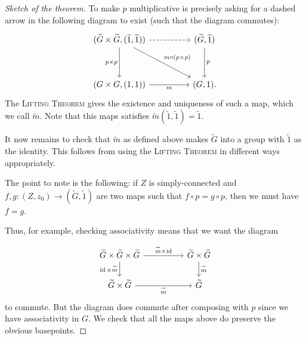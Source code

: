 \documentclass[12pt]{article}
\begin{document}
\begin{proof}[Sketch of the theorem]
	To make $p$ multiplicative is precisely asking for a dashed arrow in the following diagram to exist (such that the diagram commutes):
	\begin{equation*} 
		\begin{tikzcd}
		{(\widetilde{G} \times \widetilde{G}, (\widetilde{1}, \widetilde{1}))} \arrow[dd, "p \times p"'] \arrow[rr, dashed] \arrow[rrdd, "m \circ (p \times p)"] &  & {(\widetilde{G}, \widetilde{1})} \arrow[dd, "p"] \\ \\
		{(G \times G, (1, 1))} \arrow[rr, "m"']  &  & {(G, 1).} 
		\end{tikzcd}
	\end{equation*}
	The \textsc{Lifting Theorem} gives the existence and uniqueness of such a map, which we call $\widetilde{m}$. 
	Note that this maps satisfies $\widetilde{m}(\widetilde{1}, \widetilde{1}) = \widetilde{1}$.

	It now remains to check that $\widetilde{m}$ as defined above makes $\widetilde{G}$ 
	into a group with $\widetilde{1}$ as the identity. 
	This follows from using the \textsc{Lifting Theorem} in different ways appropriately. 

	The point to note is the following: 
	if $Z$ is simply-connected and $f, g : (Z, z_{0}) \to (\widetilde{G}, \widetilde{1})$ are two maps such that 
	$f \circ p = g \circ p$, 
	then we must have $f = g$.

	Thus, for example, checking associativity means that we want the diagram

	\begin{equation*} 
		\begin{tikzcd}
		\widetilde{G} \times \widetilde{G} \times \widetilde{G} \arrow[d, "\id \times \widetilde{m}"'] \arrow[rr, "\widetilde{m} \times \id"] &  & \widetilde{G} \times \widetilde{G} \arrow[d, "\widetilde{m}"] \\
		\widetilde{G} \times \widetilde{G} \arrow[rr, "\widetilde{m}"']                                               &  & \widetilde{G}                        
		\end{tikzcd}
	\end{equation*}	
	to commute. But the diagram does commute after composing with $p$ since we have associativity in $G$. 
	We check that all the maps above do preserve the obvious basepoints.
\end{proof}
\end{document}
